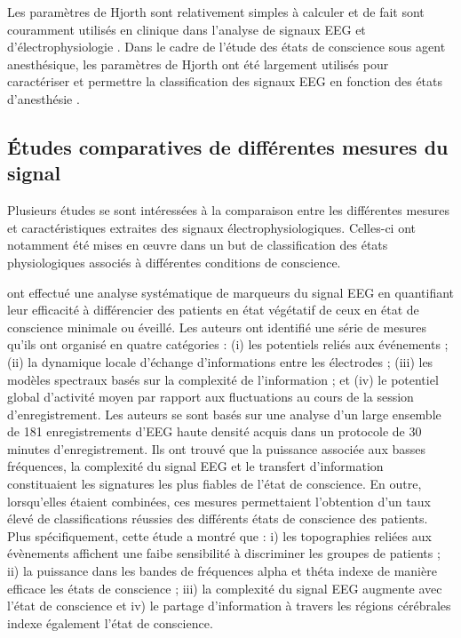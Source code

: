 Les paramètres de Hjorth sont relativement simples à calculer et de fait sont couramment utilisés en clinique dans l'analyse de signaux EEG \citep{oh2014novel} et d'électrophysiologie \citep{rizal2016multiscale}. 
Dans le cadre de l'étude des états de conscience sous agent anesthésique, les paramètres de Hjorth ont été largement utilisés pour caractériser et permettre la classification des signaux EEG en fonction des états d'anesthésie \citep{bankman1987feature, hosseini2017labeling, kumar2015electroencephalogram, rampil1998primer}. 

\subsection{Études comparatives de différentes mesures du signal}
\label{etudescomparatives}

Plusieurs études se sont intéressées à la comparaison entre les différentes mesures et caractéristiques extraites des signaux électrophysiologiques. 
Celles-ci ont notamment été mises en œuvre dans un but de classification des états physiologiques associés à différentes conditions de conscience. 

\cite{sitt2014large} ont effectué une analyse systématique de marqueurs du signal EEG en quantifiant leur efficacité à différencier des patients en état végétatif de ceux en état de conscience minimale ou éveillé. 
Les auteurs ont identifié une série de mesures qu'ils ont organisé en quatre catégories : (i) les potentiels reliés aux événements ; (ii) la dynamique locale d'échange d'informations entre les électrodes ; (iii) les modèles spectraux basés sur la complexité de l'information ; et (iv) le potentiel global d'activité moyen par rapport aux fluctuations au cours de la session d'enregistrement. 
Les auteurs se sont basés sur une analyse d'un large ensemble de 181 enregistrements d'EEG haute densité acquis dans un protocole de 30 minutes d'enregistrement. 
Ils ont trouvé que la puissance associée aux basses fréquences, la complexité du signal EEG et le transfert d'information constituaient les signatures les plus fiables de l'état de conscience. 
En outre, lorsqu'elles étaient combinées, ces mesures permettaient l'obtention d'un taux élevé de classifications réussies des différents états de conscience des patients. 
Plus spécifiquement, cette étude a montré que : i) les topographies reliées aux évènements affichent une faibe sensibilité à discriminer les groupes de patients ; ii) la puissance dans les bandes de fréquences alpha et théta indexe de manière efficace les états de conscience ; iii) la complexité du signal EEG augmente avec l'état de conscience et iv) le partage d'information à travers les régions cérébrales indexe également l'état de conscience. 

